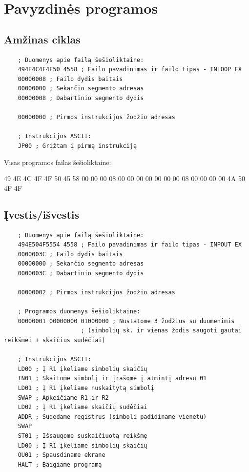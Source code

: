 \section{Pavyzdinės programos}

\subsection{Amžinas ciklas}

\begin{verbatim}
    ; Duomenys apie failą šešioliktaine:
    494E4C4F4F50 4558 ; Failo pavadinimas ir failo tipas - INLOOP EX
    00000008 ; Failo dydis baitais
    00000000 ; Sekančio segmento adresas
    00000008 ; Dabartinio segmento dydis
    
    00000000 ; Pirmos instrukcijos žodžio adresas
    
    ; Instrukcijos ASCII:
    JP00 ; Grįžtam į pirmą instrukciją
\end{verbatim}

Visas programos failas šešioliktaine:

49 4E 4C 4F 4F 50 45 58 00 00 00 08 00 00 00 00 00 00 00 08 00 00 00 00 4A 50 4F 4F

\subsection{Įvestis/išvestis}

\begin{verbatim}
    ; Duomenys apie failą šešioliktaine:
    494E504F5554 4558 ; Failo pavadinimas ir failo tipas - INPOUT EX
    0000003C ; Failo dydis baitais
    00000000 ; Sekančio segmento adresas
    0000003C ; Dabartinio segmento dydis
    
    00000002 ; Pirmos instrukcijos žodžio adresas

    ; Programos duomenys šešioliktaine:
    00000001 00000000 01000000 ; Nustatome 3 žodžius su duomenimis 
                      ; (simbolių sk. ir vienas žodis saugoti gautai reikšmei + skaičius sudėčiai)
                      
    ; Instrukcijos ASCII:
    LD00 ; Į R1 įkeliame simbolių skaičių
    IN01 ; Skaitome simbolį ir įrašome į atmintį adresu 01
    LD01 ; Į R1 įkeliame nuskaitytą simbolį
    SWAP ; Apkeičiame R1 ir R2
    LD02 ; Į R1 įkeliame skaičių sudėčiai
    ADDR ; Sudedame registrus (simbolį padidiname vienetu)
    SWAP
    ST01 ; Išsaugome suskaičiuotą reikšmę
    LD00 ; Į R1 įkeliame simbolių skaičių
    OU01 ; Spausdiname ekrane
    HALT ; Baigiame programą
\end{verbatim}

